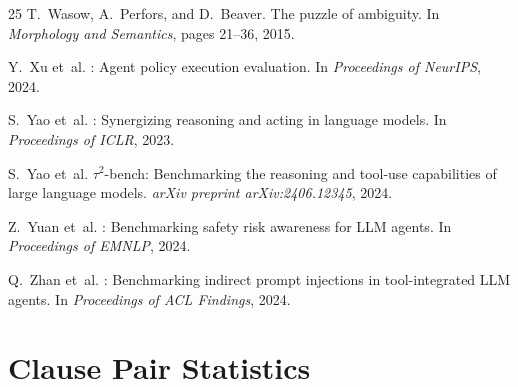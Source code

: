 \documentclass[11pt]{article}
\begin{document}
\begin{thebibliography}{25}
T.~Wasow, A.~Perfors, and D.~Beaver.
\newblock The puzzle of ambiguity.
\newblock In \emph{Morphology and Semantics}, pages 21--36, 2015.

Y.~Xu et~al.
: Agent policy execution evaluation.
\newblock In \emph{Proceedings of NeurIPS}, 2024.

S.~Yao et~al.
: Synergizing reasoning and acting in language models.
\newblock In \emph{Proceedings of ICLR}, 2023.

S.~Yao et~al.
\newblock $\tau^2$-bench: Benchmarking the reasoning and tool-use capabilities of large language models.
\newblock \emph{arXiv preprint arXiv:2406.12345}, 2024.

Z.~Yuan et~al.
: Benchmarking safety risk awareness for {LLM} agents.
\newblock In \emph{Proceedings of EMNLP}, 2024.

Q.~Zhan et~al.
: Benchmarking indirect prompt injections in tool-integrated {LLM} agents.
\newblock In \emph{Proceedings of ACL Findings}, 2024.

\end{thebibliography}

\clearpage
\appendix

\section{Clause Pair Statistics}
\label{app:clause_stats}
\end{document}
